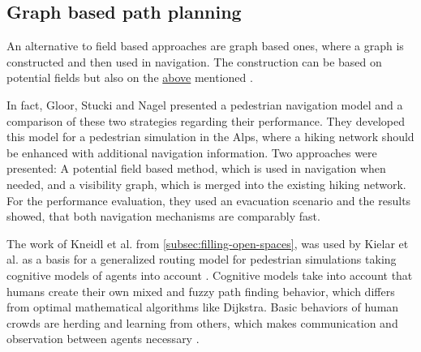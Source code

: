 	\subsection{Graph based path planning}
	
		An alternative to field based approaches are graph based ones, where a graph is constructed and then used in navigation.
		The construction can be based on potential fields but also on the \hyperref[subsec:related-work:visibility-graph]{above} mentioned .
		
		In fact, Gloor, Stucki and Nagel presented a pedestrian navigation model and a comparison of these two strategies regarding their performance\cite{gloor-hybrid-pedestrian-routing}.
		They developed this model for a pedestrian simulation in the Alps, where a hiking network should be enhanced with additional navigation information.
		Two approaches were presented: A potential field based method, which is used in navigation when needed, and a visibility graph, which is merged into the existing hiking network.
		For the performance evaluation, they used an evacuation scenario and the results showed, that both navigation mechanisms are comparably fast.
		
		The work of Kneidl et al. from \cref{subsec:filling-open-spaces}, was used by Kielar et al. as a basis for a generalized routing model for pedestrian simulations taking cognitive models of agents into account \cite[5]{kielar-unified-pedestrian-routing}.
		Cognitive models take into account that humans create their own mixed and fuzzy path finding behavior, which differs from optimal mathematical algorithms like Dijkstra.
		Basic behaviors of human crowds are herding and learning from others, which makes communication and observation between agents necessary \cite[4]{kielar-unified-pedestrian-routing}.
		
		